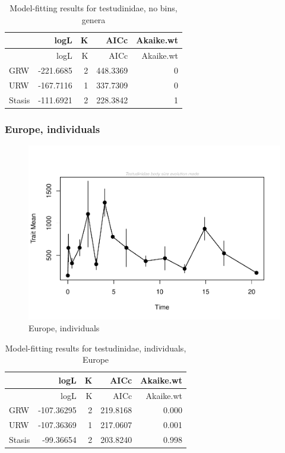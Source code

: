 \documentclass[]{article}
\begin{document}
\begin{longtable}[]{@{}lrrrr@{}}
\caption{Model-fitting results for testudinidae, no bins,
genera}\tabularnewline
\toprule
& logL & K & AICc & Akaike.wt\tabularnewline
\midrule
\endfirsthead
\toprule
& logL & K & AICc & Akaike.wt\tabularnewline
\midrule
\endhead
GRW & -221.6685 & 2 & 448.3369 & 0\tabularnewline
URW & -167.7116 & 1 & 337.7309 & 0\tabularnewline
Stasis & -111.6921 & 2 & 228.3842 & 1\tabularnewline
\bottomrule
\end{longtable}

\newpage

\subsubsection{Europe, individuals}\label{europe-individuals}

\begin{figure}[htbp]
\centering
\includegraphics{MA_JJ_files/figure-latex/paleoTS, individuals, Europe-1.pdf}
\caption{Europe, individuals}
\end{figure}

\begin{longtable}[]{@{}lrrrr@{}}
\caption{Model-fitting results for testudinidae, individuals,
Europe}\tabularnewline
\toprule
& logL & K & AICc & Akaike.wt\tabularnewline
\midrule
\endfirsthead
\toprule
& logL & K & AICc & Akaike.wt\tabularnewline
\midrule
\endhead
GRW & -107.36295 & 2 & 219.8168 & 0.000\tabularnewline
URW & -107.36369 & 1 & 217.0607 & 0.001\tabularnewline
Stasis & -99.36654 & 2 & 203.8240 & 0.998\tabularnewline
\bottomrule
\end{longtable}
\end{document}
